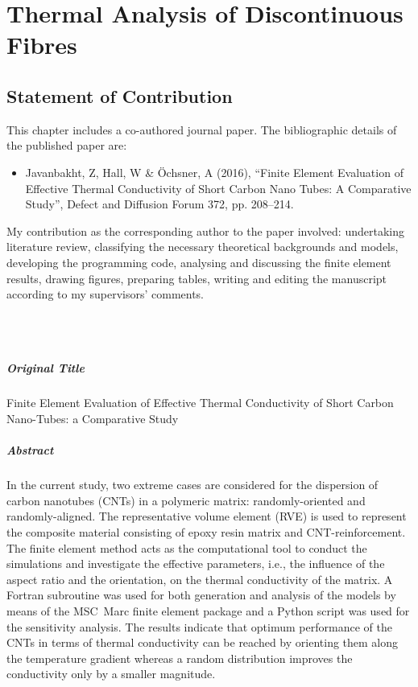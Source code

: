 \chapter{Thermal Analysis of Discontinuous Fibres}\label{chap:p2}
\section*{Statement of Contribution}
	This chapter includes a co-authored journal paper. The bibliographic details of the published paper are:
\begin{itemize}
	\item Javanbakht, Z, Hall, W \& Öchsner, A (2016), “Finite Element Evaluation of Effective Thermal Conductivity of Short Carbon Nano Tubes: A Comparative Study”, Defect and Diffusion Forum 372, pp. 208–214.
\end{itemize}
	My contribution as the corresponding author to the paper involved: undertaking literature review, classifying the necessary theoretical backgrounds and models, developing the programming code, analysing and discussing the finite element results, drawing figures, preparing tables, writing and editing the manuscript according to my supervisors’ comments.

\Zia\\
\Wayne\\
\vfill
\newpage
\paragraph{Original Title} Finite Element Evaluation of Effective Thermal Conductivity of Short Carbon Nano-Tubes: a Comparative Study

\paragraph{Abstract} In the current study, two extreme cases are considered for the dispersion of carbon nanotubes (CNTs) in a polymeric matrix: randomly-oriented and randomly-aligned. The representative volume element (RVE) is used to represent the composite material consisting of epoxy resin matrix and CNT-reinforcement. The finite element method acts as the computational tool to conduct the simulations and investigate the effective parameters, i.e., the influence of the aspect ratio and the orientation, on the thermal conductivity of the matrix. A Fortran subroutine was used for both generation and analysis of the models by means of the MSC~Marc finite element package and a Python script was used for the sensitivity analysis. The results indicate that optimum performance of the CNTs in terms of thermal conductivity can be reached by orienting them along the temperature gradient whereas a random distribution improves the conductivity only by a smaller magnitude.


